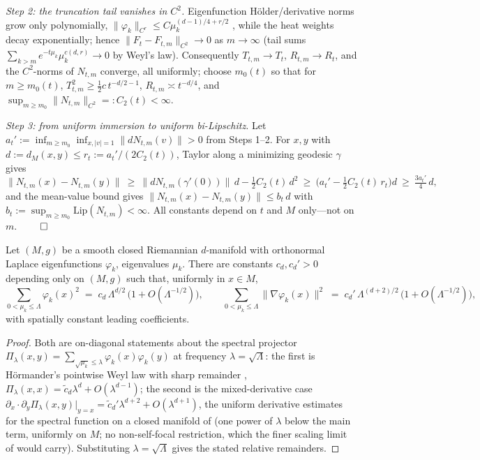 \documentclass[review,supplement]{siamart220329}
\begin{document}
\emph{Step 2: the truncation tail vanishes in $C^2$.} Eigenfunction
H\"older/derivative norms grow only polynomially,
$\lVert\varphi_k\rVert_{C^r}\le C\mu_k^{(d-1)/4+r/2}$ \cite{hormander1968},
while the heat weights decay exponentially; hence
$\lVert F_t-F_{t,m}\rVert_{C^2}\to0$ as $m\to\infty$ (tail sums
$\sum_{k>m}e^{-t\mu_k}\mu_k^{c(d,r)}\to0$ by Weyl's law). Consequently
$T_{t,m}\to T_t$, $R_{t,m}\to R_t$, and the $C^2$-norms of $N_{t,m}$ converge,
all uniformly; choose $m_0(t)$ so that for $m\ge m_0(t)$,
$T_{t,m}^2\ge\tfrac12c\,t^{-d/2-1}$, $R_{t,m}\asymp t^{-d/4}$, and
$\sup_{m\ge m_0}\lVert N_{t,m}\rVert_{C^2}=:C_2(t)<\infty$.

\emph{Step 3: from uniform immersion to uniform bi-Lipschitz.} Let
$a_t':=\inf_{m\ge m_0}\inf_{x,\lvert v\rvert=1}\lVert dN_{t,m}(v)\rVert>0$
from Steps 1--2. For $x,y$ with $d:=d_M(x,y)\le r_t:=a_t'/(2C_2(t))$, Taylor
along a minimizing geodesic $\gamma$ gives
\[
\lVert N_{t,m}(x)-N_{t,m}(y)\rVert
\ \ge\ \lVert dN_{t,m}(\gamma'(0))\rVert\,d-\tfrac12C_2(t)\,d^2
\ \ge\ \Big(a_t'-\tfrac12C_2(t)\,r_t\Big)d\ \ge\ \tfrac{3a_t'}{4}\,d,
\]
and the mean-value bound gives
$\lVert N_{t,m}(x)-N_{t,m}(y)\rVert\le b_t\,d$ with
$b_t:=\sup_{m\ge m_0}\mathrm{Lip}(N_{t,m})<\infty$. All constants depend on
$t$ and $M$ only---not on $m$. \hfill$\qed$

\begin{lemma}\label{lem:dweyl}
Let $(M,g)$ be a smooth closed Riemannian $d$-manifold with orthonormal
Laplace eigenfunctions $\varphi_k$, eigenvalues $\mu_k$. There are constants
$c_d,c_d'>0$ depending only on $(M,g)$ such that, uniformly in $x\in M$,
\[
\sum_{0<\mu_k\le\Lambda}\varphi_k(x)^2
   \;=\; c_d\,\Lambda^{d/2}\,\bigl(1+O(\Lambda^{-1/2})\bigr),
\qquad
\sum_{0<\mu_k\le\Lambda}\lVert\nabla\varphi_k(x)\rVert^2
   \;=\; c_d'\,\Lambda^{(d+2)/2}\,\bigl(1+O(\Lambda^{-1/2})\bigr),
\]
with spatially constant leading coefficients.
\end{lemma}
\begin{proof}
Both are on-diagonal statements about the spectral projector
$\Pi_\lambda(x,y)=\sum_{\sqrt{\mu_k}\le\lambda}\varphi_k(x)\varphi_k(y)$ at
frequency $\lambda=\sqrt\Lambda$: the first is H\"ormander's pointwise Weyl law
with sharp remainder \cite{hormander1968},
$\Pi_\lambda(x,x)=\tilde c_d\lambda^{d}+O(\lambda^{d-1})$; the second is the
mixed-derivative case $\partial_{x}\!\cdot\!\partial_{y}\Pi_\lambda(x,y)
\big|_{y=x}=\tilde c_d'\lambda^{d+2}+O(\lambda^{d+1})$, the uniform derivative
estimates for the spectral function on a closed manifold of \cite{binxu2004} (one
power of $\lambda$ below the main term, uniformly on $M$; no non-self-focal
restriction, which the finer scaling limit of \cite{canzanihanin2015} would
carry). Substituting $\lambda=\sqrt\Lambda$
gives the stated relative remainders.
\end{proof}
\end{document}
